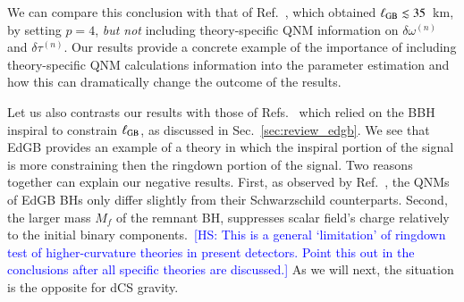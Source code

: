 \documentclass[twocolumn,
               prd,
               aps,
               superscriptaddress,
               tightenlines,
               nofootinbib,
               eqsecnum,
               amsfonts,
               amsmath,
               longbibliography]{revtex4-1}
\newcommand{\hs}[1]{{\textcolor{blue}{{[HS: #1]}} }}
\begin{document}
We can compare this conclusion with that of Ref.~\cite{Carullo:2021dui}, which obtained $\ell_{\rm GB} \lesssim 35$~km,
by setting $p=4$, \emph{but not} including theory-specific QNM information on $\delta \omega^{(n)}$ and $\delta \tau^{(n)}$.
%
Our results provide a concrete example of the importance of including
theory-specific QNM calculations information into the parameter estimation
and how this can dramatically change the outcome of the results.

Let us also contrasts our results with those of Refs.~\cite{Nair:2019iur,Perkins:2021mhb,Lyu:2022gdr}
which relied on the BBH inspiral to constrain $\ell_{\rm GB}$, as discussed in Sec.~\ref{sec:review_edgb}.
%
We see that EdGB provides an example of a theory in which the inspiral portion
of the signal is more constraining then the ringdown portion of the signal.
%
Two reasons together can explain our negative results. First, as observed by
Ref.~\cite{Blazquez-Salcedo:2016enn}, the QNMs of EdGB BHs only differ slightly
from their Schwarzschild counterparts. Second, the larger mass $M_f$ of the
remnant BH, suppresses scalar field's charge relatively to the initial binary
components.~\hs{This is a general `limitation' of ringdown test of higher-curvature theories in present detectors.
Point this out in the conclusions after all specific theories are discussed.}
%
As we will next, the situation is the opposite for dCS gravity.
\end{document}
